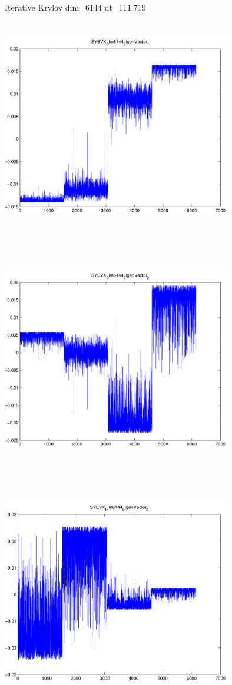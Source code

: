 \documentclass[9pt]{article}
\theoremstyle{plain}
\theoremstyle{definition}
\theoremstyle{remark}
\numberwithin{equation}{section}
\begin{document}
Iterative Krylov dim=6144 dt=111.719
\includegraphics[width=10.0cm,height=10.0cm]{SYEVX_Dim6144_EigenVector_1.pdf}

\includegraphics[width=10.0cm,height=10.0cm]{SYEVX_Dim6144_EigenVector_2.pdf}

\includegraphics[width=10.0cm,height=10.0cm]{SYEVX_Dim6144_EigenVector_3.pdf}
\end{document}
